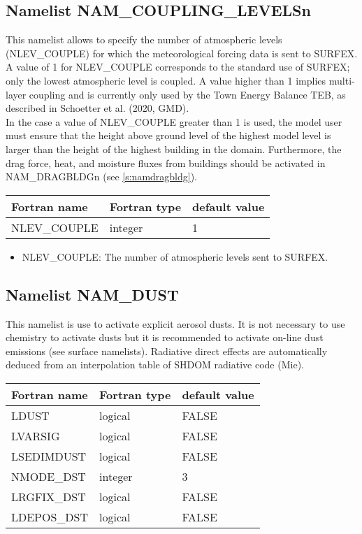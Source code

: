 \subsection{Namelist NAM\_COUPLING\_LEVELSn}
\label{s:namcouplinglevels}
%
This namelist allows to specify the number of atmospheric levels
(NLEV\_COUPLE) for which the meteorological forcing data is sent to SURFEX.
A value of 1 for NLEV\_COUPLE corresponds to the standard use of SURFEX;
only the lowest atmospheric level is coupled. A value higher than 1 implies
multi-layer coupling and is currently only used by the Town Energy Balance TEB,
as described in Schoetter et al. (2020, GMD). \\
%
In the case a value of NLEV\_COUPLE greater than 1 is used, the model
user must ensure that the height above ground level of the highest model
level is larger than the height of the highest building in the domain.
Furthermore, the drag force, heat, and moisture fluxes from buildings
should be activated in NAM\_DRAGBLDGn (see \ref{s:namdragbldg}).
%
\begin{center}
\begin{tabular} {|l|l|l|}
\hline
Fortran name & Fortran type & default value \\
\hline
NLEV\_COUPLE & integer & 1  \\
\hline
\end{tabular}
\end{center}
%
\begin{itemize}
\item NLEV\_COUPLE: The number of atmospheric levels sent to SURFEX.
\end{itemize}
%
\subsection{Namelist NAM\_DUST }
This namelist is use to activate explicit aerosol dusts. 
It is not necessary to use chemistry to activate dusts but it is recommended to activate on-line dust emissions (see surface namelists).
Radiative direct effects are automatically deduced from an interpolation table of SHDOM radiative code (Mie). 

\begin{center}
\begin{tabular} {|l|l|l|}
\hline
Fortran name & Fortran type & default value \\
\hline
LDUST       & logical  & FALSE  \\
LVARSIG     & logical  & FALSE  \\
LSEDIMDUST  & logical  & FALSE  \\
NMODE\_DST & integer  &  3  \\
LRGFIX\_DST  & logical  & FALSE  \\
LDEPOS\_DST  & logical  & FALSE  \\
\hline
\end{tabular}
\end{center}

